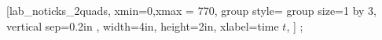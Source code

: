 \documentclass{article}
\begin{document}
\begin{lab_groupplot}{
}[lab_noticks_2quads,
	xmin=0,xmax = 770,
   group style={
        group size=1 by 3,
        vertical sep=0.2in
    },
    width=4in,
    height=2in,
    xlabel=time $t$,
]
\nextgroupplot[ylabel={current $I(t)$}]
; %

\nextgroupplot[ylabel={flux $\Phi(t)$}]

\nextgroupplot[ylabel={emf $\varepsilon(t)$}]

\end{lab_groupplot}
\end{document}
